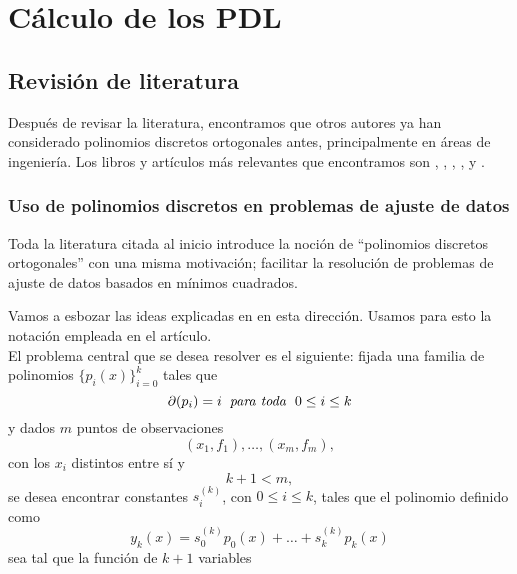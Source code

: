 \chapter{Cálculo de los PDL}

\section{Revisión de literatura}
Después de revisar la literatura, encontramos que
otros autores ya han considerado polinomios discretos ortogonales
antes, principalmente en áreas de ingeniería.
Los libros y artículos más relevantes
que encontramos son
\cite{Neuman}, \cite{papel}, \cite{george},
\cite{himmelblau}, 
y \cite{rabin}. 


\subsection{Uso de polinomios discretos en problemas de ajuste de datos}
Toda la literatura citada al inicio introduce
la noción de ``polinomios discretos ortogonales''
con una misma motivación; facilitar la resolución
de problemas de ajuste de datos basados en mínimos cuadrados.

Vamos a esbozar las ideas explicadas en
\cite{george} en esta dirección. Usamos
para esto la notación empleada
en el artículo. \\

El problema central que se desea resolver es
el siguiente:
fijada una familia de polinomios
$\{ p_{i}(x) \}_{i= 0}^{k}$ tales que
\begin{equation}
\label{ec: george 14}
\partial (p_{i}) = i \hspace{0.2cm}
\textit{para toda } \hspace{0.1cm} 0 \leq i \leq k
\end{equation}
y
dados $m$ puntos de observaciones
\[
(x_{1}, f_{1}), \ldots , (x_{m}, f_{m}),
\]
con los $x_{i}$ distintos entre sí y 
\begin{equation}
\label{eq0: 7May}
k+1 < m, 
\end{equation}
se desea encontrar
constantes $s_{i}^{(k)}$,
con $0 \leq i \leq k$, tales que 
el polinomio definido como
\[
y_{k}(x) = s_{0}^{(k)} p_{0}(x) + \ldots +  
s_{k}^{(k)} p_{k}(x) 
\]
sea tal que 
la función de $k+1$ variables


